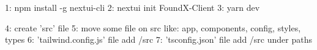 1: npm install -g nextui-cli
2: nextui init FoundX-Client
3: yarn dev


4: create 'src' file
5: move some file on src like: app, components, config, styles, types
6: 'tailwind.config.js' file add /src
7: 'tsconfig.json' file add /src under paths